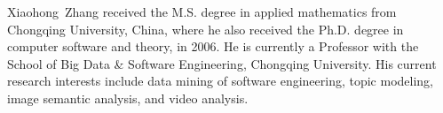 \documentclass[journal]{IEEEtran}
\begin{document}
\begin{IEEEbiography}{Xiaohong~Zhang}
    received the M.S. degree in applied mathematics from Chongqing University, China, where he also received the Ph.D. degree in computer software and theory, in 2006. He is currently a Professor with the School of Big Data \& Software Engineering, Chongqing University. His current research interests include data mining of software engineering, topic modeling, image semantic analysis, and video analysis.
\end{IEEEbiography}








\end{document}

